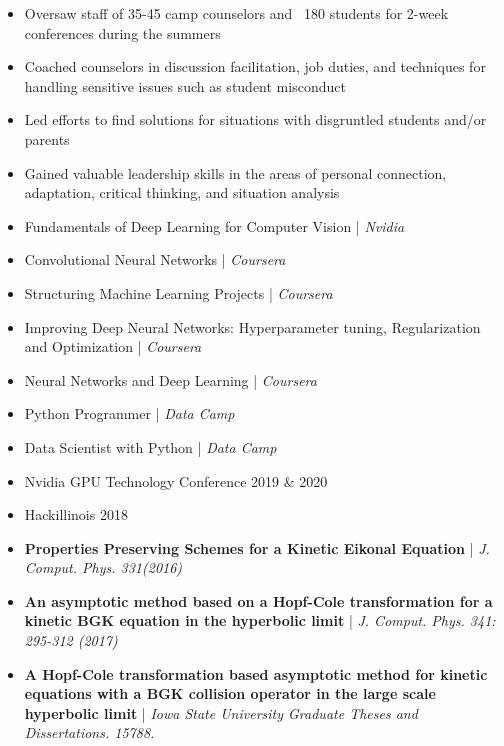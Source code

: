 \documentclass[10pt,a4paper]{altacv}
\begin{document}
\begin{itemize}
\item Oversaw staff of 35-45 camp counselors and ~180 students for 2-week conferences during the summers
\item Coached counselors in discussion facilitation, job duties, and techniques for handling sensitive issues such as student misconduct
\item Led efforts to find solutions for situations with disgruntled students and/or parents
\item Gained valuable leadership skills in the areas of personal connection, adaptation, critical thinking, and situation analysis

\end{itemize}



\begin{itemize}
\item Fundamentals of Deep Learning for Computer Vision | \textit{Nvidia}
\item Convolutional Neural Networks | \textit{Coursera}
\item Structuring Machine Learning Projects | \textit{Coursera}
\item Improving Deep Neural Networks: Hyperparameter tuning, Regularization and Optimization | \textit{Coursera}
\item Neural Networks and Deep Learning | \textit{Coursera}
\item Python Programmer | \textit{Data Camp}
\item Data Scientist with Python | \textit{Data Camp}
\end{itemize}



\begin{itemize}
\item Nvidia GPU Technology Conference 2019 \& 2020
\item Hackillinois 2018

\end{itemize}


\begin{itemize}
\item \textbf{Properties Preserving Schemes for a Kinetic Eikonal Equation} | \textit{J. Comput. Phys. 331(2016)}
\item \textbf{An asymptotic method based on a Hopf-Cole transformation for a kinetic BGK equation in the hyperbolic limit} | \textit{J. Comput. Phys. 341: 295-312 (2017)}
\item \textbf{A Hopf-Cole transformation based asymptotic method for kinetic equations with a BGK collision operator in the large scale hyperbolic limit} | \textit{Iowa State University Graduate Theses and Dissertations. 15788.}

\end{itemize}
\end{document}
